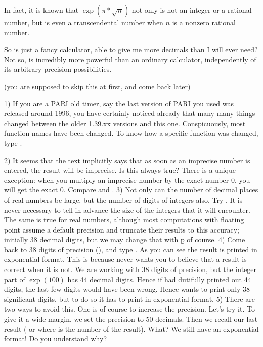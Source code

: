 In fact, it is known that $\exp(\pi*\sqrt{n})$ not only is not an integer or
a rational number, but is even a transcendental number when $n$ is a nonzero
rational number.

So  is just a fancy calculator, able to give me more decimals than I
will ever need? Not so,  is incredibly more powerful than an ordinary
calculator, independently of its arbitrary precision possibilities.

 (you are supposed to skip this at first,
and come back later)

1) If you are a PARI old timer, say the last version of PARI you used was
released around 1996, you have certainly noticed already that many many
things changed between the older 1.39.xx versions and this one.
Conspicuously, most function names have been changed. To know how a specific
function was changed, type .

2) It seems that the text implicitly says that as soon as an imprecise number
is entered, the result will be imprecise. Is this always true? There is a
unique exception: when you multiply an imprecise number by the exact number
0, you will get the exact 0. Compare  and .
\smallskip
%
3) Not only can the number of decimal places of real numbers be large, but
the number of digits of integers also. Try . It is never necessary
to tell  in advance the size of the integers that it will encounter.
The same is true for real numbers, although most computations with floating
point assume a default precision and truncate their results to this accuracy;
initially 38 decimal digits, but we may change that with \b{p} of course.
\smallskip
%
4) Come back to 38 digits of precision (), and type
. As you can see the result is printed in exponential format.
This is because  never wants you to believe that a result is correct
when it is not. We are working with 38 digits of precision, but the integer
part of $\exp(100)$ has 44 decimal digits. Hence if  had dutifully
printed out 44 digits, the last few digits would have been wrong. Hence
 wants to print only 38 significant digits, but to do so it has to
print in exponential format. \smallskip
%
5) There are two ways to avoid this. One is of course to increase the
precision. Let's try it. To give it a wide margin, we set the precision to 50
decimals. Then we recall our last result (\kbd{\%}
or  where  is the number of the result). What? We still have
an exponential format! Do you understand why?

